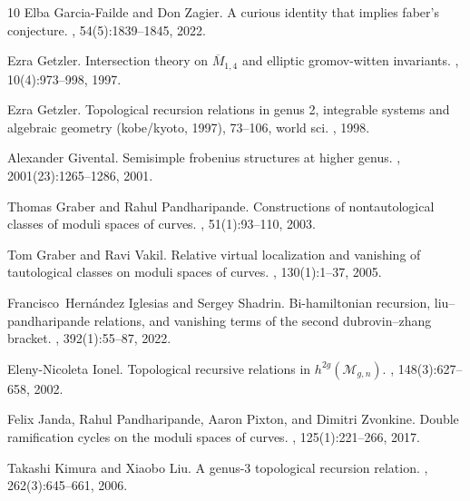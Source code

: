 \documentclass[12pt,reqno]{amsart}
\theoremstyle{plain}
\theoremstyle{definition}
\theoremstyle{remark}
\begin{document}
\begin{thebibliography}{10}
Elba Garcia-Failde and Don Zagier.
\newblock A curious identity that implies faber's conjecture.
, 54(5):1839--1845,
  2022.

Ezra Getzler.
\newblock Intersection theory on $\overline{M}_{1,4}$ and elliptic
  gromov-witten invariants.
, 10(4):973--998,
  1997.

Ezra Getzler.
\newblock Topological recursion relations in genus 2, integrable systems and
  algebraic geometry (kobe/kyoto, 1997), 73--106, world sci.
, 1998.

Alexander Givental.
\newblock Semisimple frobenius structures at higher genus.
,
  2001(23):1265--1286, 2001.

Thomas Graber and Rahul Pandharipande.
\newblock Constructions of nontautological classes of moduli spaces of curves.
, 51(1):93--110, 2003.

Tom Graber and Ravi Vakil.
\newblock Relative virtual localization and vanishing of tautological classes
  on moduli spaces of curves.
, 130(1):1--37, 2005.

Francisco~Hern{\'a}ndez Iglesias and Sergey Shadrin.
\newblock Bi-hamiltonian recursion, liu--pandharipande relations, and vanishing
  terms of the second dubrovin--zhang bracket.
, 392(1):55--87, 2022.

Eleny-Nicoleta Ionel.
\newblock Topological recursive relations in $h^{2g}(\mathcal{M}_{g,n})$.
, 148(3):627--658, 2002.

Felix Janda, Rahul Pandharipande, Aaron Pixton, and Dimitri Zvonkine.
\newblock Double ramification cycles on the moduli spaces of curves.
, 125(1):221--266,
  2017.

Takashi Kimura and Xiaobo Liu.
\newblock A genus-3 topological recursion relation.
, 262(3):645--661, 2006.


\end{thebibliography}
\end{document}
